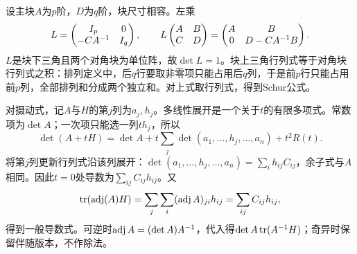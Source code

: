 \label{der:1-4}
设主块$A$为$p$阶，$D$为$q$阶，块尺寸相容。左乘
\[L=\begin{pmatrix}I_p&0\\-CA^{-1}&I_q\end{pmatrix},\qquad
L\begin{pmatrix}A&B\\C&D\end{pmatrix}=\begin{pmatrix}A&B\\0&D-CA^{-1} B\end{pmatrix}.\]
$L$是块下三角且两个对角块为单位阵，故$\det L=1$。块上三角行列式等于对角块行列式之积：排列定义中，后$q$行要取非零项只能占用后$q$列，于是前$p$行只能占用前$p$列，全部排列和分成两个独立和。对上式取行列式，得到Schur公式。

对摄动式，记$A$与$H$的第$j$列为$a_j,h_j$。多线性展开是一个关于$t$的有限多项式。常数项为$\det A$；一次项只能选一列$t h_j$，所以
\[\det(A+tH)=\det A+t\sum_j\det(a_1,\ldots,h_j,\ldots,a_n)+t^2R(t).\]
将第$j$列更新行列式沿该列展开：$\det(a_1,\ldots,h_j,\ldots,a_n)=\sum_i h_{ij}C_{ij}$，余子式与$A$相同。因此$t=0$处导数为$\sum_{ij}C_{ij}h_{ij}$。又
\[\operatorname{tr}(\operatorname{adj}(A)H)=\sum_j\sum_i(\operatorname{adj} A)_{ji}h_{ij}=\sum_{ij}C_{ij}h_{ij},\]
得到一般导数式。可逆时$\operatorname{adj} A=(\det A)A^{-1}$，代入得$\det A\operatorname{tr}(A^{-1} H)$；奇异时保留伴随版本，不作除法。

